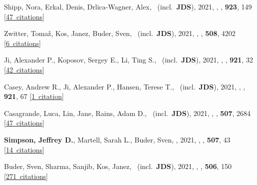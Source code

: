 \item[{\color{numcolor}\scriptsize67}] Shipp, Nora, Erkal, Denis, Drlica-Wagner, Alex, \etal\ (incl.\ \textbf{JDS}), 2021, , \apj, \textbf{923}, 149 [\href{https://ui.adsabs.harvard.edu/#abs/2021ApJ...923..149S}{47~citations}]

\item[{\color{numcolor}\scriptsize66}] Zwitter, Toma{\v{z}}, Kos, Janez, Buder, Sven, \etal\ (incl.\ \textbf{JDS}), 2021, , \mnras, \textbf{508}, 4202 [\href{https://ui.adsabs.harvard.edu/#abs/2021MNRAS.508.4202Z}{6~citations}]

\item[{\color{numcolor}\scriptsize65}] Ji, Alexander P., Koposov, Sergey E., Li, Ting S., \etal\ (incl.\ \textbf{JDS}), 2021, , \apj, \textbf{921}, 32 [\href{https://ui.adsabs.harvard.edu/#abs/2021ApJ...921...32J}{42~citations}]

\item[{\color{numcolor}\scriptsize64}] Casey, Andrew R., Ji, Alexander P., Hansen, Terese T., \etal\ (incl.\ \textbf{JDS}), 2021, , \apj, \textbf{921}, 67 [\href{https://ui.adsabs.harvard.edu/#abs/2021ApJ...921...67C}{1~citation}]

\item[{\color{numcolor}\scriptsize63}] Casagrande, Luca, Lin, Jane, Rains, Adam D., \etal\ (incl.\ \textbf{JDS}), 2021, , \mnras, \textbf{507}, 2684 [\href{https://ui.adsabs.harvard.edu/#abs/2021MNRAS.507.2684C}{47~citations}]

\item[{\color{numcolor}\scriptsize62}] \textbf{Simpson, Jeffrey D.}, Martell, Sarah L., Buder, Sven, \etal, 2021, , \mnras, \textbf{507}, 43 [\href{https://ui.adsabs.harvard.edu/#abs/2021MNRAS.507...43S}{14~citations}]

\item[{\color{numcolor}\scriptsize61}] Buder, Sven, Sharma, Sanjib, Kos, Janez, \etal\ (incl.\ \textbf{JDS}), 2021, , \mnras, \textbf{506}, 150 [\href{https://ui.adsabs.harvard.edu/#abs/2021MNRAS.506..150B}{271~citations}]

